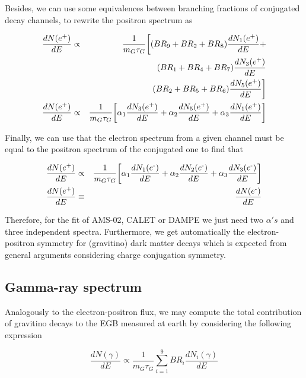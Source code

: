 \documentclass[a4paper,11pt]{article}
\begin{document}
Besides, we can use some equivalences between branching fractions of conjugated decay channels, to rewrite the positron spectrum as

\begin{eqnarray*}
\frac{dN(e\text{\textsuperscript{+}})}{dE} & \propto & \frac{1}{m_{G}\tau_{G}}\biggl[(BR_{9}+BR_{2}+BR_{8})\frac{dN_{1}(e\text{\textsuperscript{+}})}{dE}+\\
 &  & (BR_{1}+BR_{4}+BR_{7})\frac{dN_{3}(e\text{\textsuperscript{+}})}{dE}\\
 &  & (BR_{2}+BR_{5}+BR_{6})\frac{dN_{5}(e\text{\textsuperscript{+}})}{dE}\biggr]\\
\frac{dN(e\text{\textsuperscript{+}})}{dE} & \propto & \frac{1}{m_{G}\tau_{G}}\biggl[\alpha_{1}\frac{dN_{3}(e\text{\textsuperscript{+}})}{dE}+\alpha_{2}\frac{dN_{5}(e\text{\textsuperscript{+}})}{dE}+\alpha_{3}\frac{dN_{1}(e\text{\textsuperscript{+}})}{dE}\biggr]
\end{eqnarray*}


Finally, we can use that the electron spectrum from a given channel must be equal to the positron spectrum of the conjugated one to find that

\begin{eqnarray*}
\frac{dN(e\text{\textsuperscript{+}})}{dE} & \propto & \frac{1}{m_{G}\tau_{G}}\biggl[\alpha_{1}\frac{dN_{1}(e\text{\textsuperscript{-}})}{dE}+\alpha_{2}\frac{dN_{2}(e\text{\textsuperscript{-}})}{dE}+\alpha_{3}\frac{dN_{3}(e\text{\textsuperscript{-}})}{dE}\biggr]\\
\frac{dN(e\text{\textsuperscript{+}})}{dE} & \equiv & \frac{dN(e\text{\textsuperscript{-}})}{dE}
\end{eqnarray*}


Therefore, for the fit of AMS-02, CALET or DAMPE we just need two
$\alpha's$ and three independent spectra. Furthermore, we get automatically
the electron-positron symmetry for (gravitino) dark matter decays
which is expected from general arguments considering charge conjugation
symmetry.

\subsection{Gamma-ray spectrum}

Analogously to the electron-positron flux, we may compute the total contribution of gravitino decays to the EGB measured at earth by considering the following expression

\begin{equation}
\frac{dN(\gamma)}{dE}\propto\frac{1}{m_{G}\tau_{G}}\sum_{i=1}^{9}BR_{i}\frac{dN_{i}(\gamma)}{dE}
\end{equation}
\end{document}
